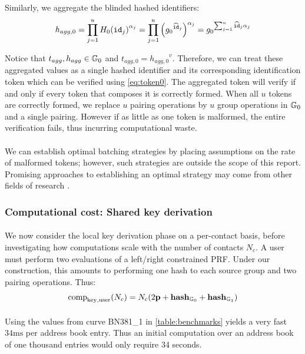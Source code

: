 	\noindent Similarly, we aggregate the blinded hashed identifiers:
	\begin{equation}
		h_{agg,0} = \prod_{j=1}^{u} {H_0(\mathtt{id}_j)}^{\alpha_j} = \prod_{j=1}^{u} \left({g_0}^{\widehat{\mathtt{id}}_j}\right)^{\alpha_j} = {g_0}^{\sum_{j = 1}^u \widehat{\mathtt{id}}_j\alpha_j}
	\end{equation}
	
	\noindent Notice that $t_{agg}, h_{agg} \in \mathbb{G}_0$ and $t_{agg,0} = {h_{agg,0}}^v$. Therefore, we can treat these aggregated values as a single hashed identifier and its corresponding identification token which can be verified using \autoref{eq:token0}. The aggregated token will verify if and only if every token that composes it is correctly formed. When all $u$ tokens are correctly formed, we replace $u$ pairing operations by $u$ group operations in $\mathbb{G}_0$ and a single pairing. However if as little as one token is malformed, the entire verification fails, thus incurring computational waste.
	
	\paragraph{} We can establish optimal batching strategies by placing assumptions on the rate of malformed tokens; however, such strategies are outside the scope of this report. Promising approaches to establishing an optimal strategy may come from other fields of research \cite{covid}. 
	
	\subsubsection{Computational cost: Shared key derivation}
	
	\paragraph{} We now consider the local key derivation phase on a per-contact basis, before investigating how computations scale with the number of contacts $N_c$. A user must perform two evaluations of a left/right constrained PRF. Under our construction, this amounts to performing one hash to each source group and two pairing operations. Thus:
	\begin{equation}
		\mathrm{comp}_{\mathrm{key, user}}(N_c) = N_c(2\mathbf{p} + \mathbf{hash}_{\mathbb{G}_0} + \mathbf{hash}_{\mathbb{G}_1})
	\end{equation}
	

	\paragraph{} Using the values from curve BN381\_1 in \autoref{table:benchmarks} yields  a very fast $34\mathrm{ms}$ per address book entry. Thus an initial computation over an address book of one thousand entries would only require 34 seconds.
	
